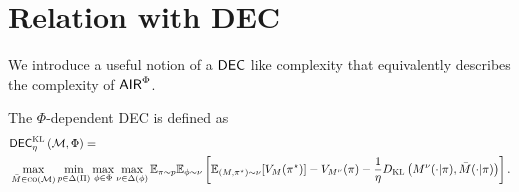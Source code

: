 \section{Relation with DEC}
We introduce a useful notion of a $\mathsf{DEC}$ like complexity that equivalently describes the complexity of $\mathsf{AIR}^{\Phi}$.

\begin{definition} The $\Phi$-dependent DEC is defined as
\begin{align*}
&\mathsf{DEC}_{\eta}^{\textsc{KL}}\left(\mathcal{M}, \Phi\right) = 
\\&\max_{\Bar{M} \in \textsc{co}(\mathcal{M})}\min_{p\in\Delta(\Pi)}\max_{\phi\in\Phi} \max_{\nu\in \Delta(\phi)}   \mathbb{E}_{\pi\sim p} \mathbb{E}_{\phi\sim \nu}   \left[\mathbb{E}_{(M,\pi^\star)\sim \nu}[V_{M}(\pi^\star)] - V_{M^\nu}(\pi) - \frac{1}{\eta}  D_{\textsc{KL}}\left( M^{\nu}(\cdot|\pi), \Bar{M}(\cdot|\pi) \right)\right]. 
\end{align*}
\end{definition}

